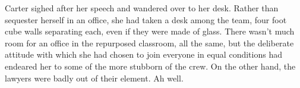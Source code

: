 Carter sighed after her speech and wandered over to her desk.  Rather than sequester herself in an office, she had taken a desk among the team, four foot cube walls separating each, even if they were made of glass.  There wasn't much room for an office in the repurposed classroom, all the same, but the deliberate attitude with which she had chosen to join everyone in equal conditions had endeared her to some of the more stubborn of the crew.  On the other hand, the lawyers were badly out of their element.  Ah well.
